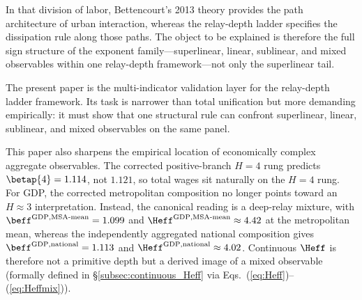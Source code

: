 In that division of labor, Bettencourt's 2013 theory provides the path
architecture of urban interaction, whereas the relay-depth ladder specifies the dissipation rule
along those paths. The object to be explained is therefore the full sign
structure of the exponent family---superlinear, linear, sublinear, and mixed
observables within one relay-depth framework---not only the superlinear tail.

The present paper is the multi-indicator validation layer for the relay-depth ladder framework.
Its task is narrower than total unification but more demanding empirically:
it must show that one structural rule can confront superlinear, linear,
sublinear, and mixed observables on the same panel.

This paper also sharpens the empirical location of economically
complex aggregate observables.
The corrected positive-branch \(H=4\) rung predicts
\(\betap{4}=1.114\), not \(1.121\), so total wages sit naturally on the
\(H=4\) rung.
For GDP, the corrected metropolitan composition no longer points toward an
\(H\approx 3\) interpretation.
Instead, the canonical reading is a deep-relay mixture, with
\(\beff^{\mathrm{GDP,MSA\text{-}mean}}=1.099\) and
\(\Heff^{\mathrm{GDP,MSA\text{-}mean}}\approx 4.42\) at the metropolitan mean,
whereas the independently aggregated national composition gives
\(\beff^{\mathrm{GDP,national}}=1.113\) and
\(\Heff^{\mathrm{GDP,national}}\approx 4.02\).
Continuous \(\Heff\) is therefore not a primitive depth but a derived image
of a mixed observable (formally defined in
\S\ref{subsec:continuous_Heff} via Eqs.~(\ref{eq:Heff})--(\ref{eq:Heffmix})).

